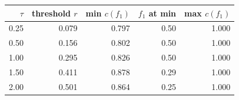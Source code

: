 \begin{tabular}{rrrrr}
\toprule
$\tau$ & threshold $r$ & min $c(f_1)$ & $f_1$ at min & max $c(f_1)$ \\
\midrule
0.25 & 0.079 & 0.797 & 0.50 & 1.000 \\
0.50 & 0.156 & 0.802 & 0.50 & 1.000 \\
1.00 & 0.295 & 0.826 & 0.50 & 1.000 \\
1.50 & 0.411 & 0.878 & 0.29 & 1.000 \\
2.00 & 0.501 & 0.864 & 0.25 & 1.000 \\
\bottomrule
\end{tabular}